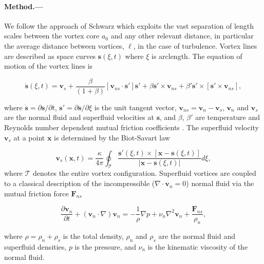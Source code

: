 \documentclass[%
 reprint,
 amsmath,amssymb,
 aps,
 prl,
]{revtex4-2}
\def \s{\mathbf{s}}
\def \v{\mathbf{v}}
\def \x{\mathbf{x}}
\begin{document}
\paragraph*{Method.---}We follow the approach of Schwarz
\cite{schwarzThreedimensionalVortexDynamics1988a} which exploits
the vast separation of length scales between the vortex core $a_0$ and any
other relevant distance, in particular the average distance between vortices,
$\ell$, in the case of turbulence. Vortex lines are described
as space curves $\s(\xi,t)$ where $\xi$ is arclength. The equation of motion 
of the vortex lines is

\begin{equation}
	\dot{\s}(\xi,t) = \v_s + \frac{\beta}{(1+\beta)}\left[\v_{ns}\cdot \s'\right]\s' + \beta\s'\times\v_{ns}+\beta'\s'\times\left[\s'\times \v_{ns}\right],
\end{equation}

\noindent
where $\dot{\s}=\partial\s/\partial t$, $\s'=\partial\s/\partial \xi$ 
is the unit tangent vector, $\v_{ns}=\v_n - \v_s$, $\v_n$ and $\v_s$ 
are the normal fluid and superfluid velocities at $\s$,
and $\beta$, $\beta'$ are temperature and Reynolds number dependent 
mutual friction coefficients \cite{galantucciNewSelfconsistentApproach2020b}. 
The superfluid velocity $\v_s$ at a point $\x$ is determined by the 
Biot-Savart law

\begin{equation}
	\v_s(\x,t) = \frac{\kappa}{4\pi}\oint_{\mathcal{T}}\frac{\s'(\xi,t)\times\left[\x-\s(\xi,t)\right]}{|\x-\s(\xi,t)|}d\xi,
\end{equation}
where $\mathcal{T}$ denotes the entire vortex configuration. 
Superfluid vortices are coupled to a classical description of the 
incompressible ($\nabla\cdot\v_n=0$) normal fluid via the mutual 
friction force $\mathbf{F}_{ns}$

\begin{equation}
	\frac{\partial \v_n}{\partial t} + (\v_n\cdot\nabla)\v_n = 
        -\frac{1}{\rho} \nabla p + \nu_n\nabla^2\v_n + \frac{\mathbf{F}_{ns}}{\rho_n},
\end{equation}

\noindent
where $\rho=\rho_n + \rho_s$ is the total density, $\rho_n$ and 
$\rho_s$ are the normal fluid and superfluid densities, $p$ is the pressure, 
and $\nu_n$ is the kinematic viscosity of the normal fluid. 
\end{document}

